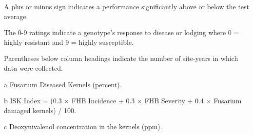 \documentclass[12pt, letterpaper]{article}
\begin{document}
\begin{landscape}
\newpage

\begin{ThreePartTable}
\begin{TableNotes}
\footnotesize
\item A plus or minus sign indicates a performance significantly above or below the test average.
\item The 0-9 ratings indicate a genotype's response to disease or lodging where 0 = highly resistant and 9 = highly susceptible.
\item Parentheses below column headings indicate the number of site-years in which data were collected.
\item [a] Fusarium Diseased Kernels (percent).
\item [b] ISK Index = (0.3 $\times$ FHB Incidence + 0.3 $\times$ FHB Severity + 0.4 $\times$ Fusarium damaged kernels) / 100.
\item [c] Deoxynivalenol concentration in the kernels (ppm).
\end{TableNotes}


\end{ThreePartTable}
\end{landscape}
\end{document}
